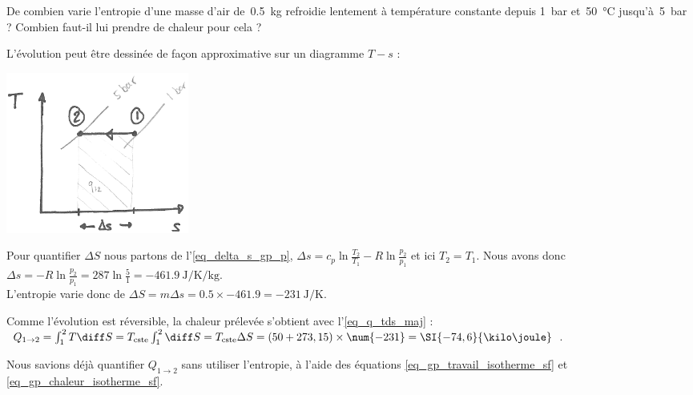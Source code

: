 		\begin{anexample}
			De combien varie l’entropie d’une masse d’air de~\SI{0,5}{\kilogram} refroidie lentement à température constante depuis \SI{1}{\bar} et~\SI{50}{\degreeCelsius} jusqu’à~\SI{5}{\bar} ? Combien faut-il lui prendre de chaleur pour cela ?
			
				\begin{answer}
					L’évolution peut être dessinée de façon approximative sur un diagramme $T-s$ :\\
						\begin{center}\includegraphics[width=6cm]{images/ts_example_2.png}\end{center}
					Pour quantifier $\Delta S$ nous partons de l’\cref{eq_delta_s_gp_p}, $\Delta s = c_p \ln \frac{T_2}{T_1} - R \ln \frac{p_2}{p_1}$ et ici $T_2=T_1$. Nous avons donc $\Delta s = -R \ln \frac{p_2}{p_1} = \num{287} \ln \frac{5}{1} =  \SI{-461,9}{\joule\per\kelvin\per\kilogram}$. \\L’entropie varie donc de $\Delta S = m \Delta s = \num{0,5} \times \num{-461,9} = \SI{-231}{\joule\per\kelvin}$. 
					
					Comme l’évolution est réversible, la chaleur prélevée s’obtient avec l’\cref{eq_q_tds_maj} : $Q_{1\to2} = \int_1^2 T \diff S = T_\text{cste} \int_1^2 \diff S = T_\text{cste} \Delta S = (50+273,15) \times \num{-231} = \SI{-74,6}{\kilo\joule}$. 
				
				\begin{remark}Nous savions déjà quantifier $Q_{1\to2}$ sans utiliser l’entropie, à l’aide des équations \ref{eq_gp_travail_isotherme_sf} et \ref{eq_gp_chaleur_isotherme_sf}.\end{remark}\end{answer}
		\end{anexample}

